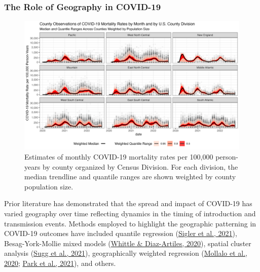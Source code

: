 \documentclass[
]{article}
\begin{document}
\hypertarget{the-role-of-geography-in-covid-19}{%
\subsubsection{The Role of Geography in COVID-19}\label{the-role-of-geography-in-covid-19}}

\begin{figure}

{\centering \includegraphics[width=6in]{figures/county_trends_by_division} 

}

\caption{Estimates of monthly COVID-19 mortality rates per 100,000 person-years by county organized by Census Division.  For each division, the median trendline and quantile ranges are shown weighted by county population size.}\label{fig:figure-county-trends}
\end{figure}

Prior literature has demonstrated that the spread and impact of COVID-19 has
varied geography over time reflecting dynamics in the timing of introduction and
transmission events. Methods employed to highlight the geographic patterning in
COVID-19 outcomes have included quantile regression
(\protect\hyperlink{ref-sigler_socio-spatial_2021}{Sigler et al., 2021}), Besag-York-Molli\textquotesingle e mixed models
(\protect\hyperlink{ref-whittle_ecological_2020}{Whittle \& Diaz-Artiles, 2020}), spatial cluster analysis (\protect\hyperlink{ref-sugg_mapping_2021}{Sugg et al., 2021}),
geographically weighted regression (\protect\hyperlink{ref-mollalo_gis-based_2020}{Mollalo et al., 2020}; \protect\hyperlink{ref-park_covid-19_2021}{Park et al., 2021}), and others.
\end{document}
